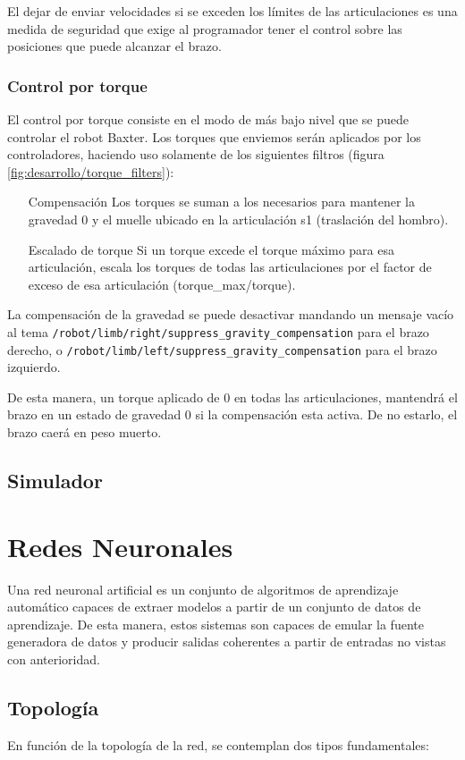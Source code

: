 El dejar de enviar velocidades si se exceden los límites de las articulaciones es una medida de seguridad que exige al programador tener el control sobre las posiciones que puede alcanzar el brazo.

\subsubsection{Control por torque}
El control por torque consiste en el modo de más bajo nivel que se puede controlar el robot Baxter. Los torques que enviemos serán aplicados por los controladores, haciendo uso solamente de los siguientes filtros (figura \ref{fig:desarrollo/torque_filters}):

\begin{enumerate}
\item [Compensación] Los torques se suman a los necesarios para mantener la gravedad 0 y el muelle ubicado en la articulación s1 (traslación del hombro).
\item [Escalado de torque] Si un torque excede el torque máximo para esa articulación, escala los torques de todas las articulaciones por el factor de exceso de esa articulación (torque\_max/torque).
\end{enumerate}

La compensación de la gravedad se puede desactivar mandando un mensaje vacío al tema \texttt{/robot/limb/right/suppress\_gravity\_compensation} para el brazo derecho, o \verb|/robot/limb/left/suppress_gravity_compensation| para el brazo izquierdo.

De esta manera, un torque aplicado de 0 en todas las articulaciones, mantendrá el brazo en un estado de gravedad 0 si la compensación esta activa. De no estarlo, el brazo caerá en peso muerto.

\subsection{Simulador}

\section{Redes Neuronales}
Una red neuronal artificial es un conjunto de algoritmos de aprendizaje automático capaces de extraer modelos a partir de un conjunto de datos de aprendizaje. De esta manera, estos sistemas son capaces de emular la fuente generadora de datos y producir salidas coherentes a partir de entradas no vistas con anterioridad.
\subsection{Topología}
En función de la topología de la red, se contemplan dos tipos fundamentales:
